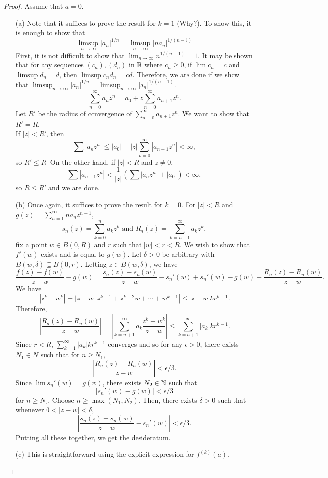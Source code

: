 	\begin{proof}
		Assume that $a = 0$.
		\begin{itemize}
			\item[(a)] Note that it suffices to prove the result for $k = 1$ (Why?). To show this, it is enough to show that
			\[ \limsup_{n\to\infty} |a_n|^{1/n} = \limsup_{n\to\infty} |na_n|^{1/(n-1)} \]
			First, it is not difficult to show that $\lim_{n\to\infty} n^{1/(n-1)} = 1$. It may be shown that for any sequences $(c_n),(d_n)$ in $\mathbb{R}$ where $c_n \ge 0$, if $\lim c_n = c$ and $\limsup d_n = d$, then $\limsup c_n d_n = cd$. Therefore, we are done if we show that $\limsup_{n\to\infty} |a_n|^{1/n} = \limsup_{n\to\infty} |a_n|^{1/(n-1)}$.
			\[ \sum_{n=0}^\infty a_n z^n = a_0 + z\sum_{n=0}^\infty a_{n+1} z^n. \]
			Let $R'$  be the radius of convergence of $\sum_{n=0}^\infty a_{n+1} z^n$. We want to show that $R' = R$. \\
			If $|z| < R'$, then 
			\[ \sum |a_n z^n| \le |a_0| + |z| \sum_{n=0}^\infty |a_{n+1} z^n| < \infty, \]
			so $R' \le R$. On the other hand, if $|z| < R$ and $z \ne 0$,
			\[ \sum |a_{n+1} z^n| < \frac{1}{|z|} \left(\sum |a_n z^n| + |a_0|\right) < \infty, \]
			so $R \le R'$ and we are done.

			\item[(b)] Once again, it suffices to prove the result for $k = 0$. For $|z| < R$ and $g(z) = \sum_{n=1}^\infty n a_n z^{n-1}$,
			\[ s_n(z) = \sum_{k=0}^n a_k z^k \text{ and } R_n(z) = \sum_{k=n+1}^\infty a_k z^k, \]
			fix a point $w \in B(0,R)$ and $r$ such that $|w| < r < R$. We wish to show that $f'(w)$ exists and is equal to $g(w)$. Let $\delta > 0$ be arbitrary with $\overline{B(w,\delta)} \subseteq B(0,r)$. Letting $z \in B(w,\delta)$, we have
			\[ \frac{f(z)-f(w)}{z-w} - g(w) = \frac{s_n(z)-s_n(w)}{z-w} - s_n'(w) + s_n'(w) - g(w) + \frac{R_n(z) - R_n(w)}{z-w}. \]
			We have
			\[ |z^k - w^k| = |z-w||z^{k-1} + z^{k-2}w + \cdots + w^{k-1}| \le |z-w| kr^{k-1}. \]
			Therefore,
			\[ \left| \frac{R_n(z) - R_n(w)}{z-w} \right| = \left| \sum_{k=n+1}^\infty a_k \frac{z^k - w^k}{z-w} \right| \le \sum_{k=n+1}^\infty |a_k| k r^{k-1}. \]
			Since $r < R$, $\sum_{k=1}^\infty |a_k| k r^{k-1}$ converges and so for any $\epsilon > 0$, there exists $N_1 \in N$ such that for $n \ge N_1$,
			\[ \left| \frac{R_n(z) - R_n(w)}{z-w} \right| < \epsilon/3. \]
			Since $\lim s_n'(w) = g(w)$, there exists $N_2 \in \mathbb{N}$ such that
			\[ |s_n'(w) - g(w)| < \epsilon/3 \]
			for $n \ge N_2$. Choose $n \ge \max(N_1, N_2)$. Then, there exists $\delta > 0$ such that whenever $0 < |z-w| < \delta$,
			\[ \left| \frac{s_n(z) - s_n(w)}{z-w} - s_n'(w) \right| < \epsilon/3. \]
			Putting all these together, we get the desideratum.

			\item[(c)] This is straightforward using the explicit expression for $f^{(k)}(a)$. \qedhere
		\end{itemize}
	\end{proof}

